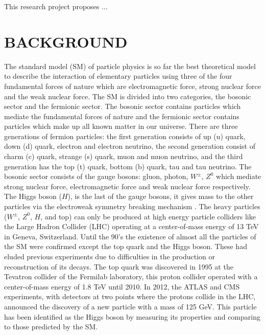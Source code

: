 \documentclass[final,12p]{article}
\begin{document}
  \vspace{1 cm}
 
  
  This research project proposes ...

  \hspace{2pt}
\vfill



\newpage
\section{BACKGROUND}


The standard model (SM) of particle physics is so far the best theoretical model to describe the interaction of elementary particles using three of the four fundamental forces of nature which are electromagnetic force, strong nuclear force and the weak nuclear force.
The SM is divided into two categories, the bosonic sector and the fermionic sector.
The bosonic sector contains particles which mediate the fundamental forces of  nature and the fermionic sector contains particles which make up all known matter in our universe.
There are three generations of fermion particles: the first generation consists of up (u) quark, down (d) quark, electron and electron neutrino, the second generation consist of charm (c) quark, strange (s) quark, muon and muon neutrino, and the third generation has the top (t) quark, bottom (b) quark, tau and tau neutrino.
The bosonic sector consists of the gauge bosons: gluon, photon, $W^{\pm}$, $Z^0$ which mediate strong nuclear force, electromagnetic force and weak nuclear force respectively.
The Higgs boson ($H$), is the last of the gauge bosons, it gives mass to the other particles via the electroweak symmetry breaking mechanism \cite{Chatrchyan:2012xdj}.
The heavy particles ($W^{\pm}$, $Z^0$, $H$, and top) can only be produced at high energy particle colliders like the Large Hadron Collider (LHC) operating at a center-of-mass energy of 13 TeV in Geneva, Switzerland.
Until the 90's the existence of almost all the particles of the SM were confirmed except the top quark and the Higgs boson. 
These had eluded previous experiments due to difficulties in the production or reconstruction of its decays.
The top quark was discovered in 1995 at the Tevatron collider of the Fermilab laboratory, this proton collider operated with a center-of-mass energy of 1.8 TeV until 2010.
In 2012, the ATLAS and CMS experiments, with detectors at two points where the protons collide in the LHC, announced the discovery of a new particle with a mass of 125 GeV.
This particle has been identified as the Higgs boson by measuring its properties and comparing to those predicted by the SM.
\end{document}
